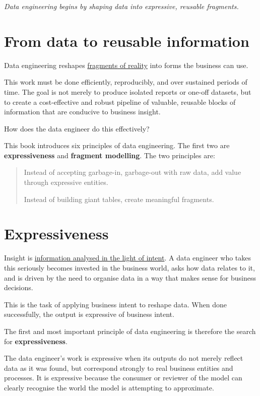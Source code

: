 \documentclass[10pt,openany,10pt]{book}
\begin{document}
\emph{Data engineering begins by shaping data into expressive, reusable
fragments.}

\section{From data to reusable
information}\label{from-data-to-reusable-information}

Data engineering reshapes
\hyperref[docs-foundations-what-is-data]{fragments of reality} into
forms the business can use.

This work must be done efficiently, reproducibly, and over sustained
periods of time. The goal is not merely to produce isolated reports or
one-off datasets, but to create a cost-effective and robust pipeline of
valuable, reusable blocks of information that are conducive to business
insight.

How does the data engineer do this effectively?

This book introduces six principles of data engineering. The first two
are \textbf{expressiveness} and \textbf{fragment modelling}. The two
principles are:

\begin{quote}
Instead of accepting garbage-in, garbage-out with raw data, add value
through expressive entities.

Instead of building giant tables, create meaningful fragments.
\end{quote}

\section{Expressiveness}\label{expressiveness}

Insight is
\hyperref[docs-foundations-what-is-data-engineering]{information
analysed in the light of intent}. A data engineer who takes this
seriously becomes invested in the business world, asks how data relates
to it, and is driven by the need to organise data in a way that makes
sense for business decisions.

This is the task of applying business intent to reshape data. When done
successfully, the output is expressive of business intent.

The first and most important principle of data engineering is therefore
the search for \textbf{expressiveness}.

The data engineer's work is expressive when its outputs do not merely
reflect data as it was found, but correspond strongly to real business
entities and processes. It is expressive because the consumer or
reviewer of the model can clearly recognise the world the model is
attempting to approximate.
\end{document}
